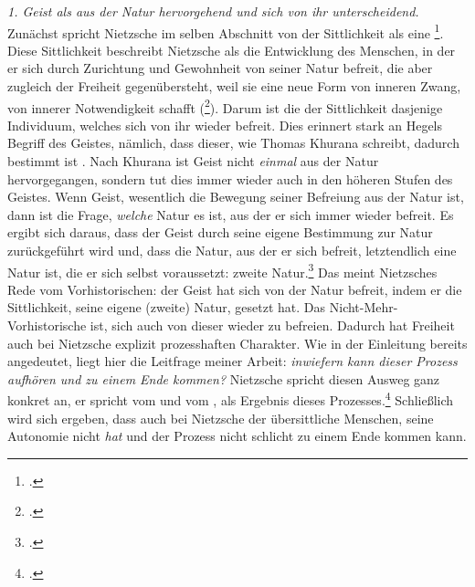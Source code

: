\documentclass[12pt, a4paper, openany]{report}
\begin{document}
\emph{1. Geist als aus der Natur hervorgehend und sich von ihr unterscheidend.}\\
Zunächst spricht Nietzsche im selben Abschnitt von der Sittlichkeit als eine \footcite[][293]{nietzsche_jenseits_2014}.
Diese Sittlichkeit beschreibt Nietzsche als die Entwicklung des Menschen, in der er sich durch Zurichtung und Gewohnheit von seiner Natur befreit, die aber zugleich der Freiheit gegenübersteht, weil sie eine neue Form von inneren Zwang, von innerer Notwendigkeit schafft (\footcite[][292]{nietzsche_jenseits_2014}).
Darum ist die  der Sittlichkeit dasjenige Individuum, welches sich von ihr wieder befreit.
Dies erinnert stark an Hegels Begriff des Geistes, nämlich, dass dieser, wie Thomas Khurana schreibt, dadurch bestimmt ist .
Nach Khurana ist Geist nicht \emph{einmal} aus der Natur hervorgegangen, sondern tut dies immer wieder auch in den höheren Stufen des Geistes.
Wenn Geist, wesentlich die Bewegung seiner Befreiung aus der Natur ist, dann ist die Frage, \emph{welche} Natur es ist, aus der er sich immer wieder befreit. 
Es ergibt sich daraus, dass der Geist durch seine eigene Bestimmung zur Natur zurückgeführt wird und, dass die Natur, aus der er sich befreit, letztendlich eine Natur ist, die er sich selbst voraussetzt: zweite Natur.\footcite[Vgl.][320]{khurana_freiheit_2017}
Das meint Nietzsches Rede vom Vorhistorischen: 
der Geist hat sich von der Natur befreit, indem er die Sittlichkeit, seine eigene (zweite) Natur, gesetzt hat. 
Das Nicht-Mehr-Vorhistorische ist, sich auch von dieser wieder zu befreien.
Dadurch hat Freiheit auch bei Nietzsche explizit prozesshaften Charakter. 
Wie in der Einleitung bereits angedeutet, liegt hier die Leitfrage meiner Arbeit: \emph{inwiefern kann dieser Prozess aufhören und zu einem Ende kommen?}
Nietzsche spricht diesen Ausweg ganz konkret an, er spricht vom  und vom , als Ergebnis dieses Prozesses.\footcite[][293]{nietzsche_jenseits_2014} 
Schließlich wird sich ergeben, dass auch bei Nietzsche der übersittliche Menschen, seine Autonomie nicht \emph{hat} und der Prozess nicht schlicht zu einem Ende kommen kann.\\
\end{document}
